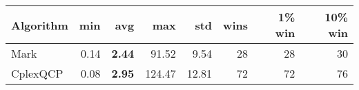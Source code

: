 \begin{tabular}{lrrrrrrr}
Algorithm & min & avg & max & std
& wins & 1\% win & 10\% win 
\\
\hline
Mark&0.14& \bf2.44& 91.52& 9.54&28&28&30\\
CplexQCP&0.08& \bf2.95& 124.47& 12.81&72&72&76
\end{tabular}
